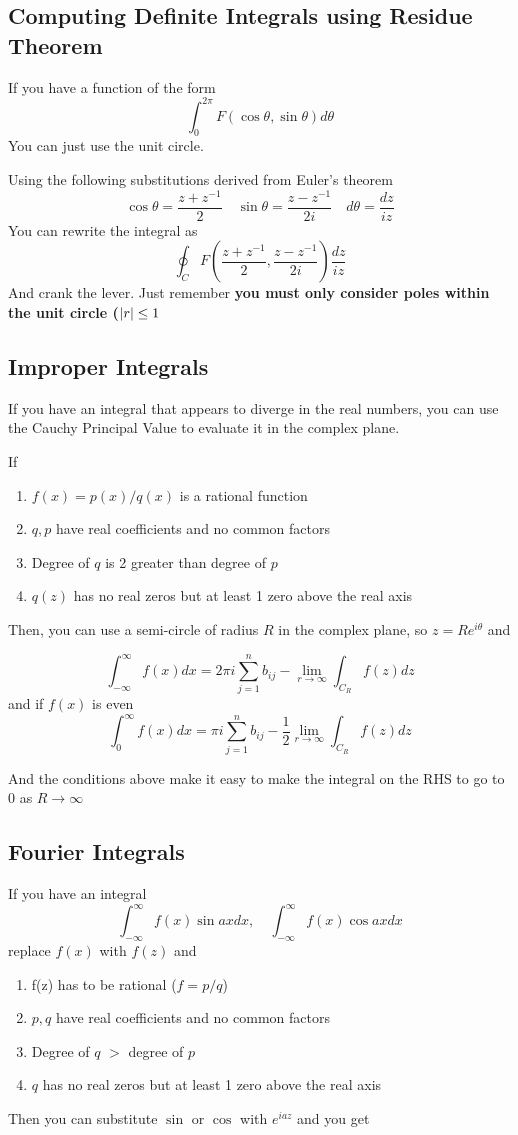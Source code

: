\documentclass{article}
\begin{document}
\subsection{Computing Definite Integrals using Residue Theorem}

If you have a function of the form
$$
\int_0^{2\pi} F(\cos\theta,\sin\theta)d\theta
$$
You can just use the unit circle.

Using the following substitutions derived from Euler's theorem
$$
\cos\theta = \frac{z+z^{-1}}{2} \quad \sin\theta = \frac{z-z^{-1}}{2i} \quad d\theta = \frac{dz}{iz}
$$
You can rewrite the integral as 
$$
\oint_{C} F\left(\frac{z+z^{-1}}{2}, \frac{z-z^{-1}}{2i}\right) \frac{dz}{iz}
$$
And crank the lever.  Just remember \textbf{you must only consider poles within the unit circle ($\abs{r} \leq 1$}

\subsection{Improper Integrals}
If you have an integral that appears to diverge in the real numbers, you can use the Cauchy Principal Value to evaluate it in the complex plane.

If
\begin{enumerate}
    \item $f(x) = p(x) / q(x)$ is a rational function
    \item $q, p$ have real coefficients and no common factors
    \item Degree of $q$ is 2 greater than degree of $p$
    \item $q(z)$ has no real zeros but at least 1 zero above the real axis
\end{enumerate}

Then, you can use a semi-circle of radius $R$ in the complex plane, so $z = Re^{i\theta}$ and

$$
\int_{-\infty}^{\infty} f(x) dx = 2\pi i \sum_{j=1}^{n} b_{ij} - \lim_{r\to\infty} \int_{C_R} f(z) dz
$$
and if $f(x)$ is even
$$
\int_{0}^{\infty} f(x) dx = \pi i \sum_{j=1}^{n} b_{ij} - \frac{1}{2}\lim_{r\to\infty} \int_{C_R} f(z) dz
$$

And the conditions above make it easy to make the integral on the RHS to go to 0 as $R\to\infty$

\subsection{Fourier Integrals}
If you have an integral
$$
\int_{-\infty}^{\infty} f(x) \sin ax dx, \quad \int_{-\infty}^{\infty} f(x) \cos ax dx
$$
replace $f(x)$ with $f(z)$ and
\begin{enumerate}
    \item f(z) has to be rational ($f = p/q$)
    \item $p, q$ have real coefficients and no common factors
    \item Degree of $q$ $>$ degree of $p$
    \item $q$ has no real zeros but at least 1 zero above the real axis
\end{enumerate}
Then you can substitute $\sin$ or $\cos$ with $e^{iaz}$ and you get
\end{document}
